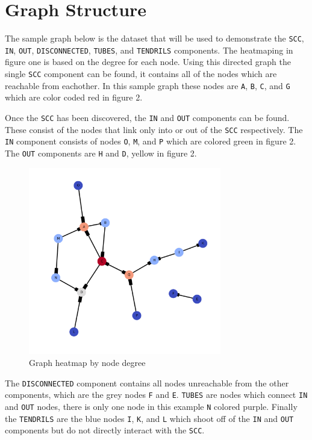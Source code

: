 \documentclass[12pt, a4paper]{article}
\newcommand{\code}[1]{\texttt{#1}}
\begin{document}

\newpage
\section{Graph Structure}

The sample graph below is the dataset that will be used to demonstrate the
\code{SCC}, \code{IN}, \code{OUT}, \code{DISCONNECTED}, \code{TUBES}, and
\code{TENDRILS} components. The heatmaping in figure one is based on the
degree for each node. Using this directed graph the single \code{SCC}
component can be found, it contains all of the nodes which are reachable
from eachother. In this sample graph these nodes are \code{A},
\code{B}, \code{C}, and \code{G} which are color coded red in figure 2.

Once the \code{SCC} has been discovered, the \code{IN} and \code{OUT} components
can be found. These consist of the nodes that link only into or out of the
\code{SCC} respectively. The \code{IN} component consists of nodes
\code{O}, \code{M}, and \code{P} which are colored green in figure 2.
The \code{OUT} components are \code{H} and \code{D}, yellow in figure 2.

\begin{figure}[h]
    \centering
    \caption{Graph heatmap by node degree}
    \includegraphics[width=0.75\textwidth]{dia/graph_heatmap.png}
\end{figure}

The \code{DISCONNECTED} component contains all nodes unreachable from
the other components, which are the grey nodes \code{F} and \code{E}.
\code{TUBES} are nodes which connect \code{IN} and \code{OUT} nodes,
there is only one node in this example \code{N} colored purple.
Finally the \code{TENDRILS} are the blue nodes \code{I}, \code{K},
and \code{L} which shoot off of the \code{IN} and \code{OUT}
components but do not directly interact with the \code{SCC}.
\end{document}

